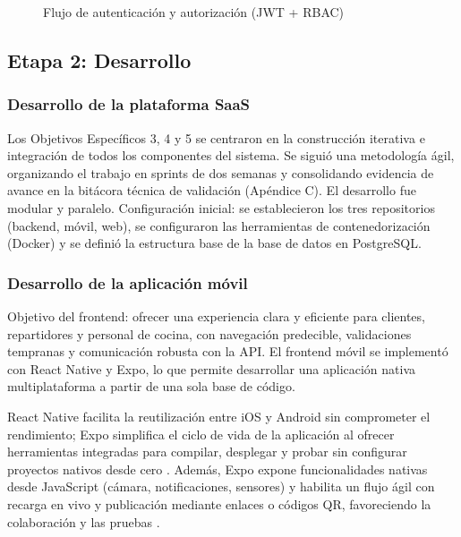   \begin{figure}[htbp]
  \centering
  \resizebox{0.82\textwidth}{!}{}
  \caption[Flujo auth/RBAC]{Flujo de autenticación y autorización (JWT + RBAC)}
  \label{fig:auth-rbac}
  \end{figure}

  \subsection{Etapa 2: Desarrollo}

  \subsubsection{Desarrollo de la plataforma SaaS}

  Los Objetivos Específicos 3, 4 y 5 se centraron en la construcción iterativa e integración de todos los componentes del sistema. Se siguió una metodología ágil, organizando el trabajo en sprints de dos semanas y consolidando evidencia de avance en la bitácora técnica de validación (Apéndice C). El desarrollo fue modular y paralelo. Configuración inicial: se establecieron los tres repositorios (backend, móvil, web), se configuraron las herramientas de contenedorización (Docker) y se definió la estructura base de la base de datos en PostgreSQL.

  \subsubsection{Desarrollo de la aplicación móvil}

  Objetivo del frontend: ofrecer una experiencia clara y eficiente para clientes, repartidores y personal de cocina, con navegación predecible, validaciones tempranas y comunicación robusta con la API. El frontend móvil se implementó con React Native y Expo, lo que permite desarrollar una aplicación nativa multiplataforma a partir de una sola base de código.

  React Native facilita la reutilización entre iOS y Android sin comprometer el rendimiento; Expo simplifica el ciclo de vida de la aplicación al ofrecer herramientas integradas para compilar, desplegar y probar sin configurar proyectos nativos desde cero \parencite{campusMVP_ReactNative_Expo}. Además, Expo expone funcionalidades nativas desde JavaScript (cámara, notificaciones, sensores) y habilita un flujo ágil con recarga en vivo y publicación mediante enlaces o códigos QR, favoreciendo la colaboración y las pruebas \parencite{campusMVP_ReactNative_Expo}.

